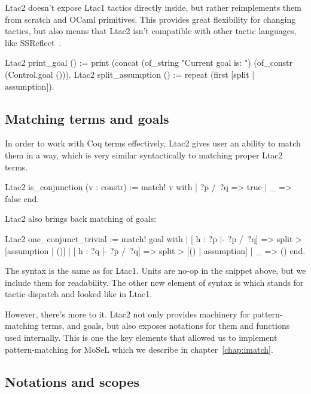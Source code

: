 Ltac2 doesn't expose Ltac1 tactics directly inside, but rather reimplements them from scratch and OCaml primitives.
This provides great flexibility for changing tactics, but also means that Ltac2 isn't compatible with other tactic languages, like SSReflect~\cite[Section~3.1.3]{thecoqdevelopmentteamCoqProofAssistant2020}.

\begin{coq}
Ltac2 print_goal () := print (concat (of_string "Current goal is: ")
                                     (of_constr (Control.goal ())).
Ltac2 split_assumption () := repeat (first [split | assumption]).
\end{coq}

\subsection{Matching terms and goals}
\label{sec:matching-terms}

In order to work with Coq terms effectively, Ltac2 gives user an ability to match them in a way, which is very similar syntactically to matching proper Ltac2 terms.
\begin{coq}
Ltac2 is_conjunction (v : constr) := match! v with
  | ?p /\ ?q => true
  | _ => false
end.
\end{coq}

Ltac2 also brings back matching of goals:
\begin{coq}
Ltac2 one_conjunct_trivial :=
  match! goal with
  | [ h : ?p |- ?p /\ ?q] => split > [assumption | ()]
  | [ h : ?q |- ?p /\ ?q] => split > [() | assumption]
  | _ => ()
  end.
\end{coq}

The syntax is the same as for Ltac1. Units \coqe{()} are no-op in the snippet above, but we include them for readability.
The other new element of syntax is  which stands for tactic dispatch and looked like  in Ltac1.

However, there's more to it.
Ltac2 not only provides machinery for pattern-matching terms, and goals, but also exposes notations for them and functions used internally.
This is one the key elements that allowed us to implement pattern-matching for MoSeL which we describe in chapter~\ref{chap:imatch}.

\subsection{Notations and scopes}
\label{subsec:ltac2-notations-scopes}

